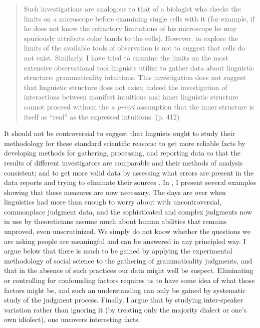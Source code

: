 \begin{quote}
Such investigations are analogous to that of a biologist who checks the limits on a microscope before examining single cells with it (for example, if he does not know the refractory limitations of his microscope he may spuriously attribute color bands to the cells). However, to explore the limits of the available tools of observation is not to suggest that cells do not exist. Similarly, I have tried to examine the limits on the most extensive observational tool linguists utilize to gather
data about linguistic structure: grammaticality intuitions. This investigation does not suggest that linguistic structure does not exist; indeed the investigation of interactions between manifest intuitions and inner linguistic structure cannot proceed without the \textit{a priori} assumption that the inner structure is itself as ``real'' as the expressed intuitions. (p. 412)
\end{quote}


It should  not be controversial to suggest that linguists ought to study their methodology for these standard scientific reasons: to get more reliable facts by developing methods for gathering, processing, and reporting data so that the results of different investigators are comparable and their methods of analysis consistent; and to get more valid data by assessing what errors are present in the data reports and trying to eliminate their sources \citep{Labov1978}. In , I present several examples showing that these measures are now necessary. The days are over when linguistics had more than enough to worry about with uncontroversial, commonplace judgment data, and the sophisticated and complex judgments now in use by theoreticians assume much about human abilities that remains unproved, even unscrutinized. We simply do not know whether the questions we are asking people are meaningful and can be answered in any principled way. I argue below that there is much to be gained by applying the experimental methodology of social science to the gathering of grammaticality judgments, and that in the absence of such practices our data might well be suspect. Eliminating or controlling for confounding factors requires us to have some idea of what those factors might be, and such an understanding can only be gained by systematic study of the judgment process. Finally, I argue that by studying inter-speaker variation rather than ignoring it (by treating only the majority dialect or one's own idiolect), one uncovers interesting facts.

